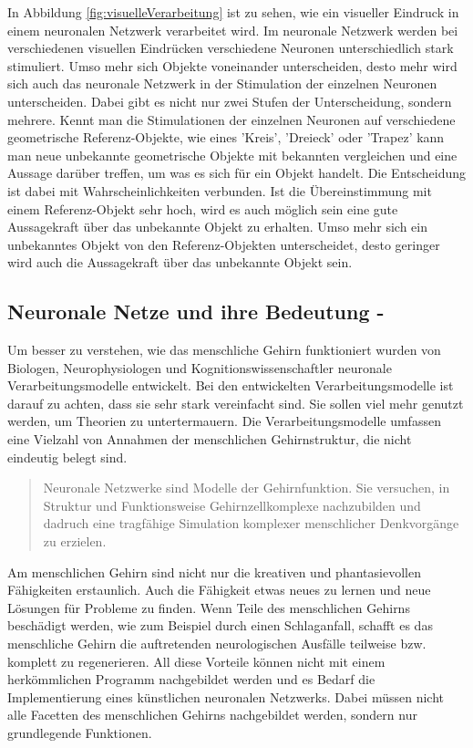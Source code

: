 In Abbildung \ref{fig:visuelleVerarbeitung} ist zu sehen, wie ein visueller Eindruck in einem neuronalen Netzwerk verarbeitet wird. Im neuronale Netzwerk werden bei verschiedenen visuellen Eindrücken verschiedene Neuronen unterschiedlich stark stimuliert. Umso mehr sich Objekte voneinander unterscheiden, desto mehr wird sich auch das neuronale Netzwerk in der Stimulation der einzelnen Neuronen unterscheiden. Dabei gibt es nicht nur zwei Stufen der Unterscheidung, sondern mehrere. Kennt man die Stimulationen der einzelnen Neuronen auf verschiedene geometrische Referenz-Objekte, wie eines 'Kreis', 'Dreieck' oder 'Trapez' kann man neue unbekannte geometrische Objekte mit bekannten vergleichen und eine Aussage darüber treffen, um was es sich für ein Objekt handelt. Die Entscheidung ist dabei mit Wahrscheinlichkeiten verbunden. Ist die Übereinstimmung mit einem Referenz-Objekt sehr hoch, wird es auch möglich sein eine gute Aussagekraft über das unbekannte Objekt zu erhalten. Umso mehr sich ein unbekanntes Objekt von den Referenz-Objekten unterscheidet, desto geringer wird auch die Aussagekraft über das unbekannte Objekt sein.

\subsection{Neuronale Netze und ihre Bedeutung - \cite{Kratzer1991}}
Um besser zu verstehen, wie das menschliche Gehirn funktioniert wurden von Biologen, Neurophysiologen und Kognitionswissenschaftler neuronale Verarbeitungsmodelle entwickelt. Bei den entwickelten Verarbeitungsmodelle ist darauf zu achten, dass sie sehr stark vereinfacht sind. Sie sollen viel mehr genutzt werden, um Theorien zu untertermauern. Die Verarbeitungsmodelle umfassen eine Vielzahl von Annahmen der menschlichen Gehirnstruktur, die nicht eindeutig belegt sind.

\begin{quote}
    Neuronale Netzwerke sind Modelle der Gehirnfunktion. Sie versuchen, in Struktur und Funktionsweise Gehirnzellkomplexe nachzubilden und dadruch eine tragfähige Simulation komplexer menschlicher Denkvorgänge zu erzielen. \cite[S. 12]{Kratzer1991} 
\end{quote}

Am menschlichen Gehirn sind nicht nur die kreativen und phantasievollen Fähigkeiten erstaunlich. Auch die Fähigkeit etwas neues zu lernen und neue Lösungen für Probleme zu finden. Wenn Teile des menschlichen Gehirns beschädigt werden, wie zum Beispiel durch einen Schlaganfall, schafft es das menschliche Gehirn die auftretenden neurologischen Ausfälle teilweise bzw. komplett zu regenerieren. All diese Vorteile können nicht mit einem herkömmlichen Programm nachgebildet werden und es Bedarf die Implementierung eines künstlichen neuronalen Netzwerks. Dabei müssen nicht alle Facetten des menschlichen Gehirns nachgebildet werden, sondern nur grundlegende Funktionen.

